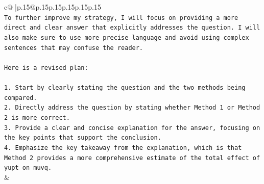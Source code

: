 \documentclass{article}
\begin{document}
{\begin{supertabular}{c@{$\;$}|p{.15\linewidth}@{}p{.15\linewidth}p{.15\linewidth}p{.15\linewidth}p{.15\linewidth}p{.15\linewidth}}
{{{\\ 
\texttt{To further improve my strategy, I will focus on providing a more direct and clear answer that explicitly addresses the question. I will also make sure to use more precise language and avoid using complex sentences that may confuse the reader. } \\
\\ 
\texttt{Here is a revised plan:} \\
\\ 
\texttt{1. Start by clearly stating the question and the two methods being compared.} \\
\texttt{2. Directly address the question by stating whether Method 1 or Method 2 is more correct.} \\
\texttt{3. Provide a clear and concise explanation for the answer, focusing on the key points that support the conclusion.} \\
\texttt{4. Emphasize the key takeaway from the explanation, which is that Method 2 provides a more comprehensive estimate of the total effect of yupt on muvq.} \\
            }
        }
    }
    & \\ \\

\end{supertabular}
}
\end{document}
